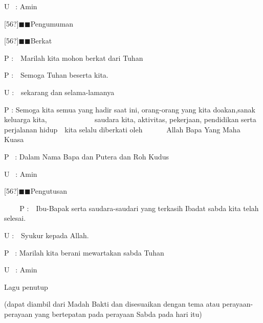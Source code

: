 \documentclass{article}
\begin{document}
U~ : Amin

[56?]${\blacksquare}{\blacksquare}$Pengumuman

[56?]${\blacksquare}{\blacksquare}$Berkat

P :~~Marilah kita mohon berkat dari Tuhan

P :~~Semoga Tuhan beserta kita.

U :~~sekarang dan selama-lamanya

P : Semoga kita semua yang hadir saat ini, orang-orang yang kita doakan,sanak keluarga kita, ~ ~ ~ ~ ~ ~ ~ ~saudara
kita, aktivitas, pekerjaan, pendidikan serta perjalanan hidup~~kita selalu diberkati oleh ~ ~ ~ ~Allah Bapa Yang Maha
Kuasa~

P~ : Dalam Nama Bapa dan Putera dan Roh Kudus

U~ : Amin

[56?]${\blacksquare}{\blacksquare}$Pengutusan

~ ~ ~P :~~Ibu-Bapak serta saudara-saudari yang terkasih Ibadat sabda kita telah selesai.

U :~~Syukur kepada Allah.

P~ : Marilah kita berani mewartakan sabda Tuhan

U~ : Amin

Lagu penutup

(dapat diambil dari Madah Bakti dan disesuaikan dengan tema atau perayaan-perayaan yang bertepatan pada perayaan Sabda
pada hari itu)
\end{document}
